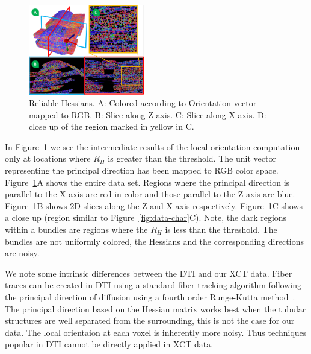 \begin{figure}[h]
\centering
\includegraphics[width=0.45\textwidth]{imagesMT2014/MT_data_rh.png}
\caption{Reliable Hessians. A: Colored according to Orientation vector mapped to RGB. B: Slice along Z axis. C: Slice along X axis. D: close up of the region marked in yellow in C.}
\label{fig:reliable_hessian}
\end{figure}
 In Figure~\ref{fig:reliable_hessian} we see the intermediate results of the local orientation computation only at locations where $R_{H}$ is greater than the threshold. The unit vector representing the principal direction has been mapped to RGB color space. Figure~\ref{fig:reliable_hessian}A shows the entire data set. Regions where the principal direction is parallel to the X axis are red in color and those parallel to the Z axis are blue. Figure~\ref{fig:reliable_hessian}B shows 2D slices along the Z and X axis respectively. Figure~\ref{fig:reliable_hessian}C shows a close up (region similar to Figure~\ref{fig:data-char}C). Note, the dark regions within a bundles are regions where the $R_H$ is less than the threshold. The bundles are not uniformly colored, the Hessians and the corresponding directions are noisy.

 
 
 We note some intrinsic differences between the DTI and our XCT data. Fiber traces can be created in DTI using a standard fiber tracking algorithm following the principal direction of diffusion using a fourth order Runge-Kutta method~\cite{Brun2003}. The principal direction based on the Hessian matrix works best when the tubular structures are well separated from the surrounding, this is not the case for our data. The local orientaion at each voxel is inherently more noisy. Thus techniques popular in DTI cannot be directly applied in XCT data.




